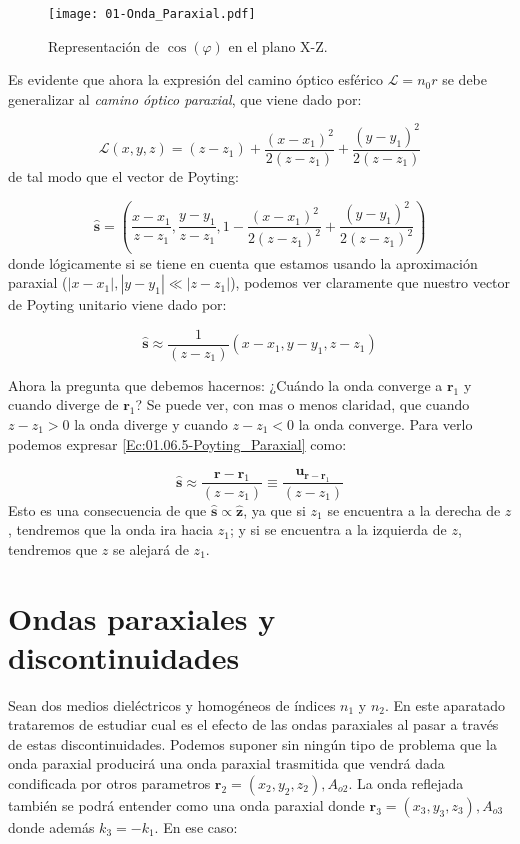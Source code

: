\documentclass[12pt,a4paper]{book}
\numberwithin{equation}{section}
\numberwithin{figure}{section}
\newcommand{\parentesis}[1]{\left( #1  \right)}
\newcommand{\1}{_{(1)}}
\newcommand{\2}{_{(2)}}
\newcommand{\zn}{\mathbf{z}}
\newcommand{\un}{\mathbf{u}}
\newcommand{\rn}{\mathbf{r}}
\newcommand{\sn}{\mathbf{s}}
\newcommand{\hns}{\hat{\sn}}
\newcommand{\hnz}{\hat{\zn}}
\theoremstyle{definition}
\begin{document}
\begin{figure}[h!] \centering
\texttt{[image: 01-Onda\_Paraxial.pdf]}
\caption{Representación de $\cos(\varphi)$ en el plano X-Z.}
\end{figure}

Es evidente que ahora la expresión del camino óptico esférico $\mathcal{L}= n_0 r$ se debe generalizar al \textit{camino óptico paraxial}, que viene dado por:

\begin{equation}
\mathcal{L} (x,y,z) = (z-z_1)+\frac{(x-x_1)^2}{2(z-z_1)} + \frac{(y-y_1)^2}{2(z-z_1)}
\end{equation}
de tal modo que el vector de Poyting:

\begin{equation}
\hns =  \parentesis{\frac{x-x_1}{z-z_1}, \frac{y-y_1}{z-z_1}, 1 - \frac{(x-x_1)^2}{2(z-z_1)^2} + \frac{(y-y_1)^2}{2(z-z_1)^2}}
\end{equation}
donde lógicamente si se tiene en cuenta que estamos usando la aproximación paraxial ($|x-x_1|,|y-y_1|\ll|z-z_1|$), podemos ver claramente que nuestro vector de Poyting unitario viene dado por:

\begin{equation}
\hns \approx \frac{1}{(z-z_1)} \parentesis{x-x_1,y-y_1,z-z_1} \label{Ec:01.06.5-Poyting_Paraxial}
\end{equation}

Ahora la pregunta que debemos hacernos: ¿Cuándo la onda converge a $\rn_1$ y cuando diverge de $\rn_1$? Se puede ver, con mas o menos claridad, que cuando $z-z_1>0$ la onda diverge y cuando $z-z_1<0$ la onda converge. Para verlo podemos expresar \ref{Ec:01.06.5-Poyting_Paraxial} como:

\begin{equation}
\hns \approx \frac{\rn - \rn_1}{(z-z_1)}  \equiv \frac{\un_{\rn-\rn_1}}{(z-z_1)}
\end{equation} 
Esto es una consecuencia de que $\hns \propto \hnz$, ya que si $z_1$ se encuentra a la derecha de $z$, tendremos que la onda ira hacia $z_1$; y si se encuentra a la izquierda de $z$, tendremos que $z$ se alejará de $z_1$. 

\section{Ondas paraxiales y discontinuidades}

Sean dos medios dieléctricos y homogéneos de índices $n_1$ y $n_2$. En este aparatado trataremos de estudiar cual es el efecto de las ondas paraxiales al pasar a través de estas discontinuidades. Podemos suponer sin ningún tipo de problema que la onda paraxial producirá una onda paraxial trasmitida que vendrá dada condificada por otros parametros $\rn_2 = (x_2,y_2,z_2),A_{o2}$. La onda reflejada también se podrá entender como una onda paraxial donde $\rn_3 = (x_3,y_3,z_3),A_{o3}$ donde además $k_3 = - k_1$. En ese caso:
\end{document}
